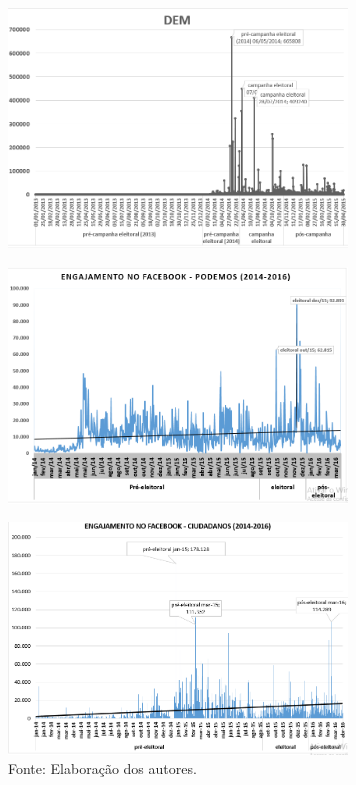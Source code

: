 \begin{figure}[!ht]
\centering
 \includegraphics[width=90mm]{./imgs/graf6_2.png}
\end{figure}

\begin{figure}[!ht]
\centering
 \includegraphics[width=90mm]{./imgs/graf6_3.png}
\end{figure}

\begin{figure}[!ht]
\centering
 \includegraphics[width=90mm]{./imgs/graf6_4.png}
\caption{Fonte: Elaboração dos autores.}
\end{figure}

